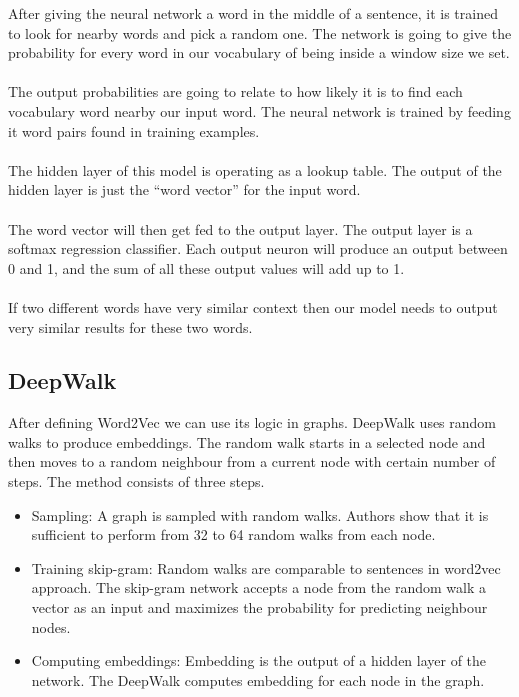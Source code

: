 After giving the neural network a word in the middle of a sentence, it is trained to look for nearby words and pick a random one. The network is going to give the probability for every word in our vocabulary of being inside a window size we set.		
 \\		
 \\		
 The output probabilities are going to relate to how likely it is to find each vocabulary word nearby our input word. The neural network is trained by feeding it word pairs found in training examples.		
 \\		
 \\		
 The hidden layer of this model is operating as a lookup table. The output of the hidden layer is just the “word vector” for the input word.		
 \\		
 \\		
 The word vector will then get fed to the output layer. The output layer is a softmax regression classifier. Each output neuron will produce an output between 0 and 1, and the sum of all these output values will add up to 1.		
 \\		
 \\		
 If two different words have very similar context then our model needs to output very similar results for these two words.		

 
  \subsection{DeepWalk}		

  After defining Word2Vec we can use its logic in graphs. DeepWalk uses random walks to produce embeddings. The random walk starts in a selected node and then moves to a random neighbour from a current node with certain number of steps. The method consists of three steps.		

   \begin{itemize}		
   \item Sampling: A graph is sampled with random walks. Authors show that it is sufficient to perform from 32 to 64 random walks from each node. 		

 
    \item Training skip-gram: Random walks are comparable to sentences in word2vec approach. The skip-gram network accepts a node from the random walk a vector as an input and maximizes the probability for predicting neighbour nodes. 		

    \item Computing embeddings: Embedding is the output of a hidden layer of the network. The DeepWalk computes embedding for each node in the graph.		

    \end{itemize}		

